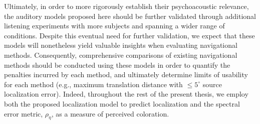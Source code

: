 Ultimately, in order to more rigorously establish their psychoacoustic relevance, the auditory models proposed here should be further validated through additional listening experiments with more subjects and spanning a wider range of conditions.
Despite this eventual need for further validation, we expect that these models will nonetheless yield valuable insights when evaluating navigational methods.
Consequently, comprehensive comparisons of existing navigational methods should be conducted using these models in order to quantify the penalties incurred by each method, and ultimately determine limits of usability for each method (e.g., maximum translation distance with $\leq 5^\circ$ source localization error).
Indeed, throughout the rest of the present thesis, we employ both the proposed localization model to predict localization and the spectral error metric, $\rho_\eta$, as a measure of perceived coloration.